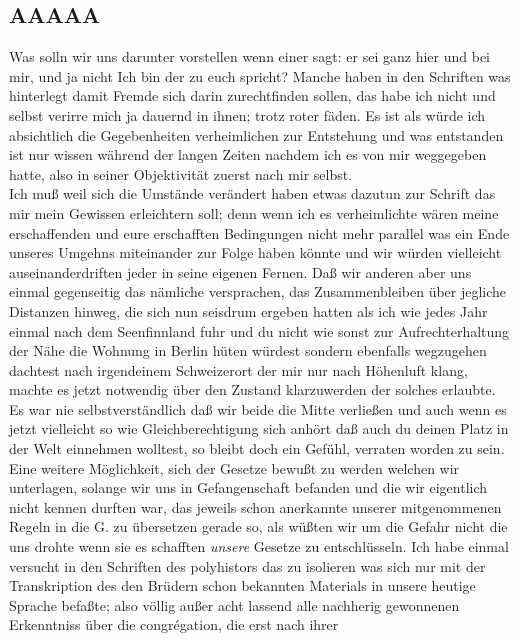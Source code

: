 \documentclass[
]{article}
\author{}
\date{\vspace{-2.5em}}
\begin{document}
\subsection{AAAAA}\label{aaaaa}

Was solln wir uns darunter vorstellen wenn einer sagt: er sei ganz hier
und bei mir, und ja nicht Ich bin der zu euch spricht? Manche haben in
den Schriften was hinterlegt damit Fremde sich darin zurechtfinden
sollen, das habe ich nicht und selbst verirre mich ja dauernd in ihnen;
trotz roter fäden. Es ist als würde ich absichtlich die Gegebenheiten
verheimlichen zur Entstehung und was entstanden ist nur wissen während
der langen Zeiten nachdem ich es von mir weggegeben hatte, also in
seiner Objektivität zuerst nach mir selbst.\\
Ich muß weil sich die Umstände verändert haben etwas dazutun zur Schrift
das mir mein Gewissen erleichtern soll; denn wenn ich es verheimlichte
wären meine erschaffenden und eure erschafften Bedingungen nicht mehr
parallel was ein Ende unseres Umgehns miteinander zur Folge haben könnte
und wir würden vielleicht auseinanderdriften jeder in seine eigenen
Fernen. Daß wir anderen aber uns einmal gegenseitig das nämliche
versprachen, das Zusammenbleiben über jegliche Distanzen hinweg, die
sich nun seisdrum ergeben hatten als ich wie jedes Jahr einmal nach dem
Seenfinnland fuhr und du nicht wie sonst zur Aufrechterhaltung der Nähe
die Wohnung in Berlin hüten würdest sondern ebenfalls wegzugehen
dachtest nach irgendeinem Schweizerort der mir nur nach Höhenluft klang,
machte es jetzt notwendig über den Zustand klarzuwerden der solches
erlaubte. Es war nie selbstverständlich daß wir beide die Mitte
verließen und auch wenn es jetzt vielleicht so wie Gleichberechtigung
sich anhört daß auch du deinen Platz in der Welt einnehmen wolltest, so
bleibt doch ein Gefühl, verraten worden zu sein.\\
Eine weitere Möglichkeit, sich der Gesetze bewußt zu werden welchen wir
unterlagen, solange wir uns in Gefangenschaft befanden und die wir
eigentlich nicht kennen durften war, das jeweils schon anerkannte
unserer mitgenommenen Regeln in die G. zu übersetzen gerade so, als
wüßten wir um die Gefahr nicht die uns drohte wenn sie es schafften
\emph{unsere} Gesetze zu entschlüsseln. Ich habe einmal versucht in den
Schriften des polyhistors das zu isolieren was sich nur mit der
Transkription des den Brüdern schon bekannten Materials in unsere
heutige Sprache befaßte; also völlig außer acht lassend alle nachherig
gewonnenen Erkenntniss über die congrégation, die erst nach ihrer
\end{document}
